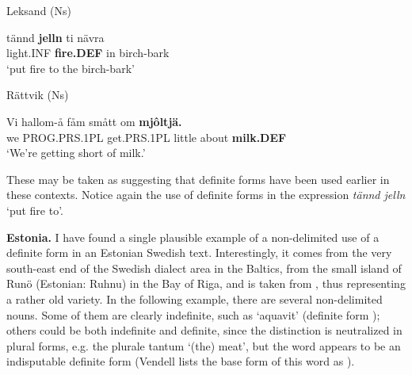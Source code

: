 
\item 

\label{bkm:Ref154222785}Leksand (Ns)



 \ea\label{}
\gll tännd  \textbf{jelln} ti  nävra\\


light.INF  \textbf{fire.DEF} in  birch-bark\\

\glt ‘put fire to the birch-bark’

\z

\item 

Rättvik (Ns)



 \ea\label{}
\gll Vi  hallom-å  fåm  smått  om  \textbf{mjôltjä.}\\


we  PROG.PRS.1PL  get.PRS.1PL  little  about  \textbf{milk.DEF}\\

\glt ‘We’re getting short of milk.’

\z

These may be taken as suggesting that definite forms have been used earlier in these contexts.  Notice again the use of definite forms in the expression \textit{tännd jelln} ‘put fire to’.


\textbf{Estonia.} I have found a single plausible example of a non-delimited use of a definite form in an Estonian Swedish text. Interestingly, it comes from the very south-east end of the Swedish dialect area in the Baltics, from the small island of Runö (Estonian: Ruhnu) in the Bay of Riga, and is taken from \citet{Vendell1882}, thus representing a rather old variety. In the following example, there are several non-delimited nouns. Some of them are clearly indefinite, such as  ‘aquavit’ (definite form ); others could be both indefinite and definite, since the distinction is neutralized in plural forms, e.g. the plurale tantum  ‘(the) meat’, but the word  appears to be an indisputable definite form (Vendell lists the base form of this word as ).

